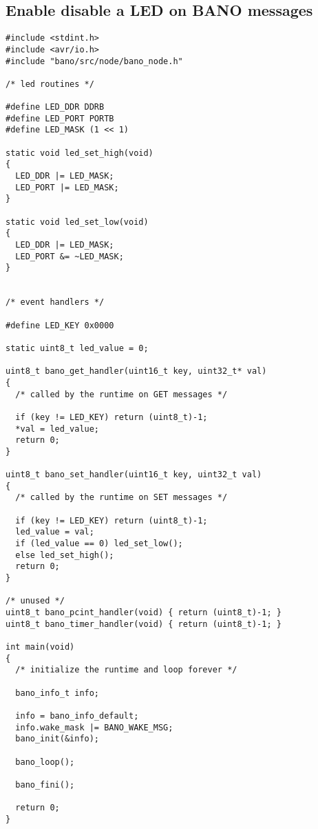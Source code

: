 \documentclass[a4paper, 11pt]{article}
\begin{document}
\subsection{Enable disable a LED on BANO messages}
\begin{tiny}
\begin{verbatim}
#include <stdint.h>
#include <avr/io.h>
#include "bano/src/node/bano_node.h"

/* led routines */

#define LED_DDR DDRB
#define LED_PORT PORTB
#define LED_MASK (1 << 1)

static void led_set_high(void)
{
  LED_DDR |= LED_MASK;
  LED_PORT |= LED_MASK;
}

static void led_set_low(void)
{
  LED_DDR |= LED_MASK;
  LED_PORT &= ~LED_MASK;
}


/* event handlers */

#define LED_KEY 0x0000

static uint8_t led_value = 0;

uint8_t bano_get_handler(uint16_t key, uint32_t* val)
{
  /* called by the runtime on GET messages */

  if (key != LED_KEY) return (uint8_t)-1;
  *val = led_value;
  return 0;
}

uint8_t bano_set_handler(uint16_t key, uint32_t val)
{
  /* called by the runtime on SET messages */

  if (key != LED_KEY) return (uint8_t)-1;
  led_value = val;
  if (led_value == 0) led_set_low();
  else led_set_high();
  return 0;
}

/* unused */
uint8_t bano_pcint_handler(void) { return (uint8_t)-1; }
uint8_t bano_timer_handler(void) { return (uint8_t)-1; }

int main(void)
{
  /* initialize the runtime and loop forever */

  bano_info_t info;

  info = bano_info_default;
  info.wake_mask |= BANO_WAKE_MSG;
  bano_init(&info);

  bano_loop();

  bano_fini();

  return 0;
}

\end{verbatim}
\end{tiny}


\clearpage
\end{document}
